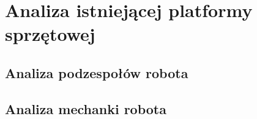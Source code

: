 \chapter{Analiza istniejącej platformy sprzętowej}
\section{Analiza podzespołów robota}
\section{Analiza mechanki robota}